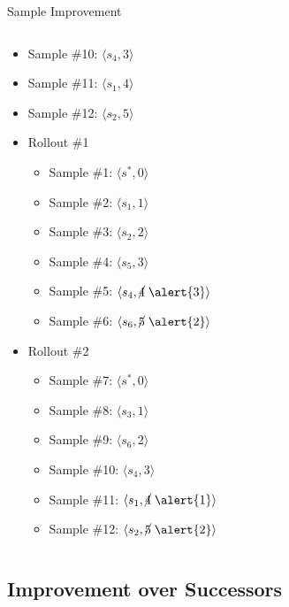 \documentclass{gkibeamer}
\begin{document}
\begin{frame}{Sample Improvement}
\begin{columns}
\begin{column}{0.5\textwidth}
{\begin{itemize}
\begin{itemize}
            \item Sample \#10: $\langle s_4, 3 \rangle$ \pause
            \item Sample \#11: $\langle s_1, 4 \rangle$ \pause
            \item Sample \#12: $\langle s_2, 5 \rangle$
        \end{itemize}
    \end{itemize}
}
 {
    \begin{itemize}
        \pause
        \item Rollout \#1
        \begin{itemize}
            \item Sample \#1: $\langle s^*, 0 \rangle$
            \item Sample \#2: $\langle s_1, 1 \rangle$
            \item Sample \#3: $\langle s_2, 2 \rangle$
            \item Sample \#4: $\langle s_5, 3 \rangle$
            \item Sample \#5: $\langle s_4, \text{\cancel{4}}\;\alert{3} \rangle$
            \item Sample \#6: $\langle s_6, \text{\cancel{5}}\;\alert{2} \rangle$
        \end{itemize}
        \item Rollout \#2
        \begin{itemize}
            \item Sample \#7: $\langle s^*, 0 \rangle$
            \item Sample \#8: $\langle s_3, 1 \rangle$
            \item Sample \#9: $\langle s_6, 2 \rangle$
            \item Sample \#10: $\langle s_4, 3 \rangle$
            \item Sample \#11: $\langle s_1, \text{\cancel{4}}\;\alert{1} \rangle$
            \item Sample \#12: $\langle s_2, \text{\cancel{5}}\;\alert{2} \rangle$
        \end{itemize}
    \end{itemize}
}
\end{column}
\end{columns}
\end{frame}

\subsection{Improvement over Successors}
\end{document}
